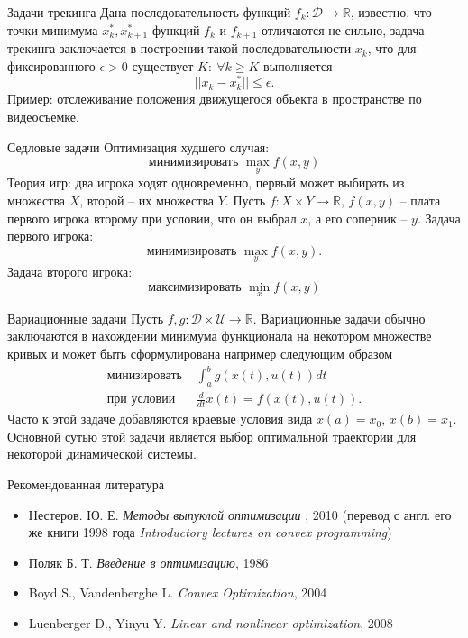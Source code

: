 \documentclass[10pt]{beamer}
\begin{document}
\begin{frame}{Задачи трекинга}
Дана последовательность функций $f_k:\mathcal{D}\rightarrow \mathbb{R}$, известно, что точки минимума $x_k^*, x_{k+1}^*$ функций $f_k$ и $f_{k+1}$ отличаются не сильно, задача трекинга заключается в построении такой последовательности $x_k$, что для фиксированного $\epsilon>0$ существует $K:~\forall k\geq K$ выполняется
$$
||x_k-x_k^*||\leq \epsilon.
$$
\pause
Пример: отслеживание положения движущегося объекта в пространстве по видеосъемке.
\end{frame}

\begin{frame}{Седловые задачи}
Оптимизация худшего случая:
$$
\mbox{минимизировать } \max_y f(x, y)
$$
\pause
Теория игр: два игрока ходят одновременно, первый может выбирать из множества $X$, второй --  их множества $Y$. Пусть $f:X\times Y\rightarrow \mathbb{R}$, $f(x, y)$ -- плата первого игрока второму при условии, что он выбрал $x$, а его соперник -- $y$. Задача первого игрока:
$$
\mbox{минимизировать } \max_y f(x, y).
$$
\pause
Задача второго игрока:
$$
\mbox{максимизировать } \min_x f(x, y)
$$
\end{frame}

\begin{frame}{Вариационные задачи}
Пусть $f, g:\mathcal{D}\times \mathcal{U}\rightarrow \mathbb{R}$. Вариационные задачи обычно заключаются в нахождении минимума функционала на некотором множестве кривых и может быть сформулирована например следующим образом
$$
\begin{array}{ll}
\mbox{минизировать } & \int_a^bg(x(t), u(t))dt\\
\mbox{при условии } & \frac{d}{dt}x(t)=f(x(t), u(t)).
\end{array}
$$
\pause
Часто к этой задаче добавляются краевые условия вида $x(a)=x_0$, $x(b)=x_1$. Основной сутью этой задачи является выбор оптимальной траектории для некоторой динамической системы.
\end{frame}

\begin{frame}
\begin{center}
\end{center}
\end{frame}

\begin{frame}{Рекомендованная литература}
\begin{itemize}
\item Нестеров. Ю. Е. \textit{Методы выпуклой оптимизации }, 2010 (перевод с англ. его же книги 1998 года \textit{Introductory lectures on convex programming})
\item Поляк Б. Т. \textit{Введение в оптимизацию}, 1986 
\item Boyd S., Vandenberghe L. \textit{Convex Optimization}, 2004
\item Luenberger D., Yinyu Y. \textit{Linear and nonlinear optimization}, 2008
\end{itemize}
\end{frame}
\end{document}
